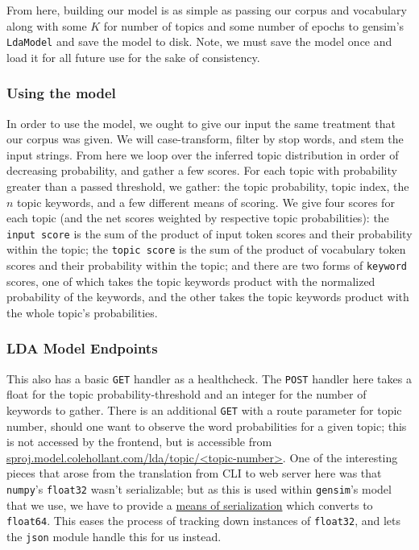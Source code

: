 \documentclass[11pt, twoside, reqno]{book}
\begin{document}
From here, building our model is as simple as passing our corpus and vocabulary along with some $K$ for number of topics and some number of epochs to gensim's \texttt{LdaModel} and save the model to disk. Note, we must save the model once and load it for all future use for the sake of consistency.

\subsubsection{\textbf{Using the model}}

In order to use the model, we ought to give our input the same treatment that our corpus was given. We will case-transform, filter by stop words, and stem the input strings. From here we loop over the inferred topic distribution in order of decreasing probability, and gather a few scores. For each topic with probability greater than a passed threshold, we gather: the topic probability, topic index, the $n$ topic keywords, and a few different means of scoring. We give four scores for each topic (and the net scores weighted by respective topic probabilities): the \texttt{input score} is the sum of the product of input token scores and their probability within the topic; the \texttt{topic score} is the sum of the product of vocabulary token scores and their probability within the topic; and there are two forms of \texttt{keyword} scores, one of which takes the topic keywords product with the normalized probability of the keywords, and the other takes the topic keywords product with the whole topic's probabilities.

\subsubsection{\textbf{LDA Model Endpoints}}

This also has a basic \texttt{GET} handler as a healthcheck. The \texttt{POST} handler here takes a float for the topic probability-threshold and an integer for the number of keywords to gather. There is an additional \texttt{GET} with a route parameter for topic number, should one want to observe the word probabilities for a given topic; this is not accessed by the frontend, but is accessible from \href{https://sproj.model.colehollant.com/lda/topic/1}{sproj.model.colehollant.com/lda/topic/<topic-number>}. One of the interesting pieces that arose from the translation from CLI to web server here was that \texttt{numpy}'s \texttt{float32} wasn't serializable; but as this is used within \texttt{gensim}'s model that we use, we have to provide a \href{https://ellisvalentiner.com/post/serializing-numpyfloat32-json/}{means of serialization} which converts to \texttt{float64}. This eases the process of tracking down instances of \texttt{float32}, and lets the \texttt{json} module handle this for us instead.
\end{document}
